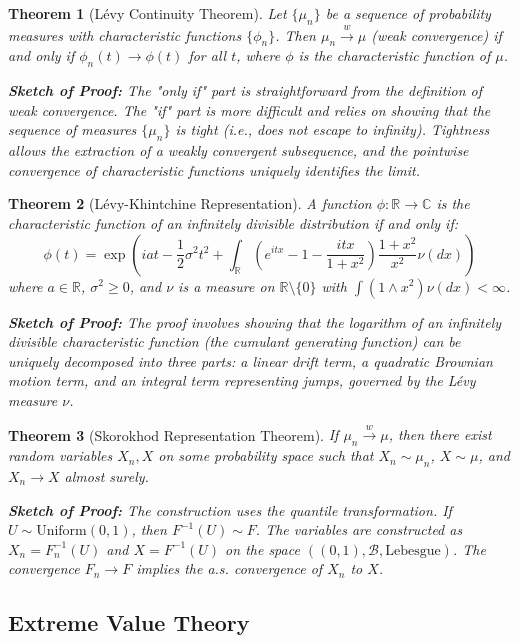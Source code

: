 \documentclass[12pt,a4paper]{article}
\newtheorem{theorem}{Theorem}[section]
\theoremstyle{remark}
\begin{document}
\begin{theorem}[Lévy Continuity Theorem]
Let $\{\mu_n\}$ be a sequence of probability measures with characteristic functions $\{\phi_n\}$. Then $\mu_n \stackrel{w}{\to} \mu$ (weak convergence) if and only if $\phi_n(t) \to \phi(t)$ for all $t$, where $\phi$ is the characteristic function of $\mu$.

\textbf{Sketch of Proof:} The "only if" part is straightforward from the definition of weak convergence. The "if" part is more difficult and relies on showing that the sequence of measures $\{\mu_n\}$ is tight (i.e., does not escape to infinity). Tightness allows the extraction of a weakly convergent subsequence, and the pointwise convergence of characteristic functions uniquely identifies the limit.
\end{theorem}

\begin{theorem}[Lévy-Khintchine Representation]
A function $\phi: \mathbb{R} \to \mathbb{C}$ is the characteristic function of an infinitely divisible distribution if and only if:
$$\phi(t) = \exp\left(iat - \frac{1}{2}\sigma^2 t^2 + \int_{\mathbb{R}} (e^{itx} - 1 - \frac{itx}{1+x^2}) \frac{1+x^2}{x^2} \nu(dx)\right)$$
where $a \in \mathbb{R}$, $\sigma^2 \geq 0$, and $\nu$ is a measure on $\mathbb{R} \setminus \{0\}$ with $\int (1 \wedge x^2) \nu(dx) < \infty$.

\textbf{Sketch of Proof:} The proof involves showing that the logarithm of an infinitely divisible characteristic function (the cumulant generating function) can be uniquely decomposed into three parts: a linear drift term, a quadratic Brownian motion term, and an integral term representing jumps, governed by the Lévy measure $\nu$.
\end{theorem}

\begin{theorem}[Skorokhod Representation Theorem]
If $\mu_n \stackrel{w}{\to} \mu$, then there exist random variables $X_n, X$ on some probability space such that $X_n \sim \mu_n$, $X \sim \mu$, and $X_n \to X$ almost surely.

\textbf{Sketch of Proof:} The construction uses the quantile transformation. If $U \sim \text{Uniform}(0,1)$, then $F^{-1}(U) \sim F$. The variables are constructed as $X_n = F_n^{-1}(U)$ and $X = F^{-1}(U)$ on the space $((0,1), \mathcal{B}, \text{Lebesgue})$. The convergence $F_n \to F$ implies the a.s. convergence of $X_n$ to $X$.
\end{theorem}

\subsection{Extreme Value Theory}
\end{document}
